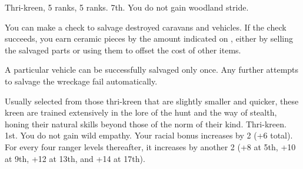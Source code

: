 {Thri-kreen,  5 ranks,  5 ranks.}
{7th.}
{You do not gain woodland stride.}
{
	You can make a  check to salvage destroyed caravans and vehicles. If the check succeeds, you earn ceramic pieces by the amount indicated on , either by selling the salvaged parts or using them to offset the cost of other items.

	A particular vehicle can be successfully salvaged only once. Any further attempts to salvage the wreckage fail automatically.

}
{Usually selected from those thri-kreen that are slightly smaller and quicker, these kreen are trained extensively in the lore of the hunt and the way of stealth, honing their natural skills beyond those of the norm of their kind.}
{Thri-kreen.}
{1st.}
{You do not gain wild empathy.}
{
	Your racial  bonus increases by 2 (+6 total). For every four ranger levels thereafter, it increases by another 2 (+8 at 5th, +10 at 9th, +12 at 13th, and +14 at 17th).
}

